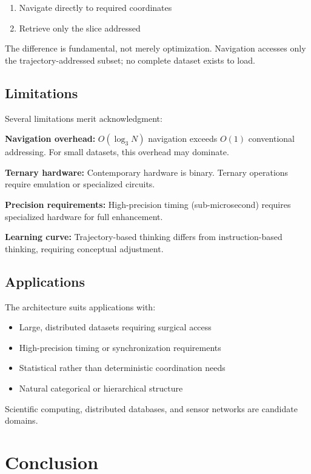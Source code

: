 \documentclass[10pt,twocolumn]{article}
\theoremstyle{definition}
\theoremstyle{remark}
\begin{document}
\begin{enumerate}[nosep]
\item Navigate directly to required coordinates
\item Retrieve only the slice addressed
\end{enumerate}

The difference is fundamental, not merely optimization. Navigation accesses only the trajectory-addressed subset; no complete dataset exists to load.

\subsection{Limitations}

Several limitations merit acknowledgment:

\textbf{Navigation overhead:} $O(\log_3 N)$ navigation exceeds $O(1)$ conventional addressing. For small datasets, this overhead may dominate.

\textbf{Ternary hardware:} Contemporary hardware is binary. Ternary operations require emulation or specialized circuits.

\textbf{Precision requirements:} High-precision timing (sub-microsecond) requires specialized hardware for full enhancement.

\textbf{Learning curve:} Trajectory-based thinking differs from instruction-based thinking, requiring conceptual adjustment.

\subsection{Applications}

The architecture suits applications with:

\begin{itemize}[nosep]
\item Large, distributed datasets requiring surgical access
\item High-precision timing or synchronization requirements
\item Statistical rather than deterministic coordination needs
\item Natural categorical or hierarchical structure
\end{itemize}

Scientific computing, distributed databases, and sensor networks are candidate domains.

\section{Conclusion}
\label{sec:conclusion}
\end{document}
